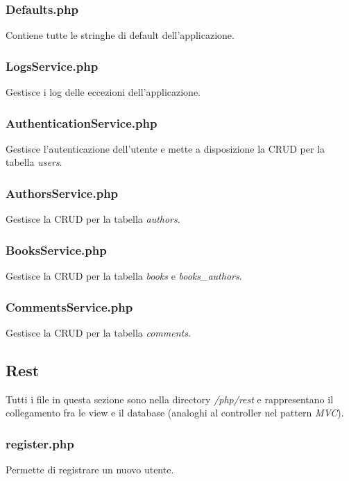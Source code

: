 \documentclass[italian]{article}
\begin{document}
\subsubsection{Defaults.php}
Contiene tutte le stringhe di default dell'applicazione.


\subsubsection{LogsService.php}
Gestisce i log delle eccezioni dell'applicazione.


\subsubsection{AuthenticationService.php}
Gestisce l'autenticazione dell'utente e mette a disposizione la CRUD per la tabella \textit{users}.


\subsubsection{AuthorsService.php}
Gestisce la CRUD per la tabella \textit{authors}.


\subsubsection{BooksService.php}
Gestisce la CRUD per la tabella \textit{books} e \textit{books\_authors}.


\subsubsection{CommentsService.php}
Gestisce la CRUD per la tabella \textit{comments}.


\subsection{Rest}
Tutti i file in questa sezione sono nella directory \textit{/php/rest} e rappresentano il collegamento fra le view e il database (analoghi al controller nel pattern \textit{MVC}).

\subsubsection{register.php}
Permette di registrare un nuovo utente.

\end{document}
